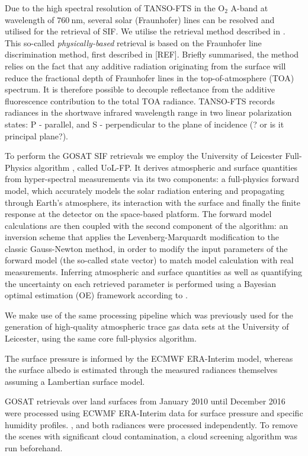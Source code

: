 \documentclass[preprint, a4paper, 10pt, times]{elsarticle}
\begin{document}
Due to the high spectral resolution of TANSO-FTS in the O$_2$ A-band at wavelength of $760\:\mathrm{nm}$, several solar (Fraunhofer) lines can be resolved and utilised for the retrieval of SIF. We utilise the retrieval method described in \citet{Frankenberg2011}. This so-called \textit{physically-based} retrieval is based on the Fraunhofer line discrimination method, first described in [REF]. Briefly summarised, the method relies on the fact that any additive radiation originating from the surface will reduce the fractional depth of Fraunhofer lines in the top-of-atmosphere (TOA) spectrum. It is therefore possible to decouple reflectance from the additive fluorescence contribution to the total TOA radiance. TANSO-FTS records radiances in the shortwave infrared wavelength range in two linear polarization states: P - parallel, and S - perpendicular to the plane of incidence (? or is it principal plane?).

To perform the GOSAT SIF retrievals we employ the University of Leicester Full-Physics algorithm \citep{Cogan2012}, called UoL-FP. It derives atmospheric and surface quantities from hyper-spectral measurements via its two components: a full-physics forward model, which accurately models the solar radiation entering and propagating through Earth's atmosphere, its interaction with the surface and finally the finite response at the detector on the space-based platform. The forward model calculations are then coupled with the second component of the algorithm: an inversion scheme that applies the Levenberg-Marquardt modification to the classic Gauss-Newton method, in order to modify the input parameters of the forward model (the so-called state vector) to match model calculation with real measurements. Inferring atmospheric and surface quantities as well as quantifying the uncertainty on each retrieved parameter is performed using a Bayesian optimal estimation (OE) framework according to \citet{Rodgers2000}.

We make use of the same processing pipeline which was previously used for the generation of high-quality atmospheric trace gas data sets \citep{Buchwitz2017} at the University of Leicester, using the same core full-physics algorithm. 


The surface pressure is informed by the ECMWF ERA-Interim model, whereas the surface albedo is estimated through the measured radiances themselves assuming a Lambertian surface model.

 GOSAT retrievals over land surfaces from January 2010 until December 2016 were processed using ECWMF ERA-Interim data for surface pressure and specific humidity profiles. , and both radiances were processed independently. To remove the scenes with significant cloud contamination, a cloud screening algorithm was run beforehand. 
\end{document}

